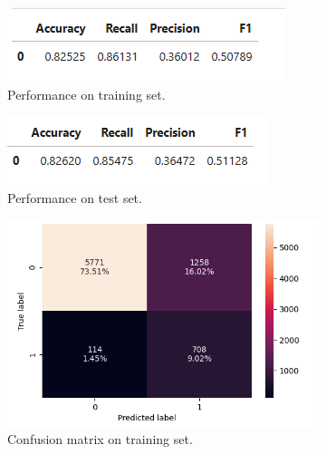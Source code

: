 \documentclass[12pt,a4paper]{article}
\begin{document}
	\begin{figure}[h]
		\centering
		\begin{subfigure}[t]{0.49\textwidth}
			\includegraphics[width=\textwidth]{lg2_train_perf.png}
			\caption{Performance on training set.}
			\label{fig:lg2_train_perf}
		\end{subfigure}
		\hfill
		\begin{subfigure}[t]{0.49\textwidth}
			\includegraphics[width=\textwidth]{lg2_test_perf.png}
			\caption{Performance on test set.}
			\label{fig:lg2_test_per}
		\end{subfigure}
		\begin{subfigure}[t]{0.5\textwidth}
			\includegraphics[width=\textwidth]{lg2_c_Matrix_train.png}
			\caption{Confusion matrix on training set.}
			\label{fig:lg2_c_Matrix_train}
		\end{subfigure}
		\hfill
		\begin{subfigure}[t]{0.45\textwidth}

\end{subfigure}
\end{figure}
\end{document}
